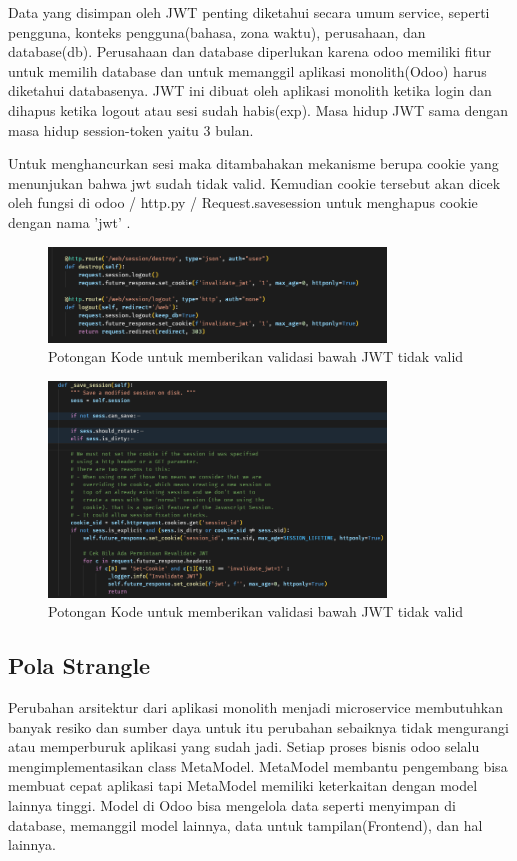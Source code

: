 Data yang disimpan oleh JWT penting diketahui secara umum service, seperti pengguna, konteks pengguna(bahasa, zona waktu), perusahaan, dan database(db).  Perusahaan dan database diperlukan karena odoo memiliki fitur untuk memilih database dan untuk memanggil  aplikasi monolith(Odoo) harus diketahui databasenya. JWT ini dibuat oleh aplikasi monolith ketika login dan dihapus ketika logout atau sesi sudah habis(exp). Masa hidup JWT sama dengan masa hidup session-token yaitu 3 bulan.

Untuk menghancurkan sesi maka ditambahakan mekanisme berupa cookie yang menunjukan bahwa jwt sudah tidak valid. Kemudian cookie tersebut akan dicek oleh fungsi di odoo / http.py / Request.savesession untuk menghapus cookie dengan nama 'jwt' . 
\begin{figure}[htbp]
	\centering
	\includegraphics[width=0.8\textwidth]{img/bab_4/triggerCookieDel.png}
	\caption{Potongan Kode untuk memberikan validasi bawah JWT tidak valid}
	\label{fig:example}
\end{figure}

\begin{figure}[htbp]
	\centering
	\includegraphics[width=0.8\textwidth]{img/bab_4/removeCookie.png}
	\caption{Potongan Kode untuk memberikan validasi bawah JWT tidak valid}
	\label{fig:example}
\end{figure}



\subsection{Pola Strangle}
Perubahan arsitektur dari aplikasi monolith menjadi microservice membutuhkan banyak resiko dan sumber daya untuk itu perubahan sebaiknya tidak mengurangi atau memperburuk aplikasi yang sudah jadi. Setiap proses bisnis odoo selalu mengimplementasikan class MetaModel. MetaModel membantu pengembang bisa membuat cepat aplikasi tapi MetaModel memiliki keterkaitan dengan model lainnya tinggi. Model di Odoo bisa mengelola data seperti menyimpan di database, memanggil model lainnya, data untuk tampilan(Frontend), dan hal lainnya.

